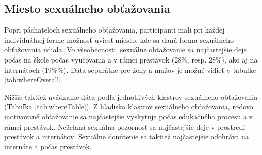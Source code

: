 \documentclass[
]{article}
\begin{document}
\hypertarget{miesto-sexuuxe1lneho-obux165aux17eovania}{%
\subsection{Miesto sexuálneho obťažovania}\label{miesto-sexuuxe1lneho-obux165aux17eovania}}

Popri páchateľoch sexuálneho obťažovania, participanti mali pri každej individuálnej forme možnosť uviesť miesto, kde sa daná forma sexuálneho obťažovania udiala. Vo všeobecnosti, sexuálne obťažovanie sa najčastejšie deje počas na škole počas vyučovania a v rámci prestávok (28\%, resp. 28\%), ako aj na internátoch (19\%\%). Dáta separátne pre ženy a mužov je možné vidieť v tabuľke \ref{tab:whereOverall}.

Nižšie taktiež uvádzame dáta podľa jednotlivých klastrov sexuálneho obťažovania (Tabuľka \ref{tab:whereTable}). Z hľadiska klastrov sexuálneho obťažovania, rodovo motivované obťažovanie sa najčastejšie vyskytuje počas edukačného procesu a v rámci prestávok. Neželaná sexuálna pozornosť sa najčastejšie deje v prostredí prestávok a internátov. Sexuálne donútenie sa taktiež najčastejšie odohráva na internáte a počas prestávok.

\begin{table}[H]

\caption{\label{tab:whereOverall}Miesto sexuálneho obťažovania}
\centering
{}
\end{table}
\end{document}
